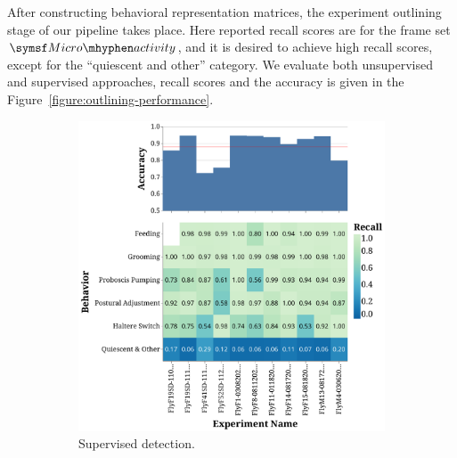 After constructing behavioral representation matrices, the experiment outlining stage of our pipeline takes place.
Here reported recall scores are for the frame set $\MicroActivity$, and it is desired to achieve high recall scores, except for the ``quiescent and other'' category.
We evaluate both unsupervised and supervised approaches, recall scores and the accuracy is given in the Figure~\ref{figure:outlining-performance}.

\begin{figure}[thb!]
	\centering
	\begin{subfigure}[b]{0.495\linewidth}
		\centering\includegraphics[width=\linewidth]{figures/OutliningPerformance-Supervised.pdf}
		\caption{Supervised detection.}
	\end{subfigure}%
	\hfill
	\begin{subfigure}[b]{0.495\linewidth}

\end{subfigure}
\end{figure}
